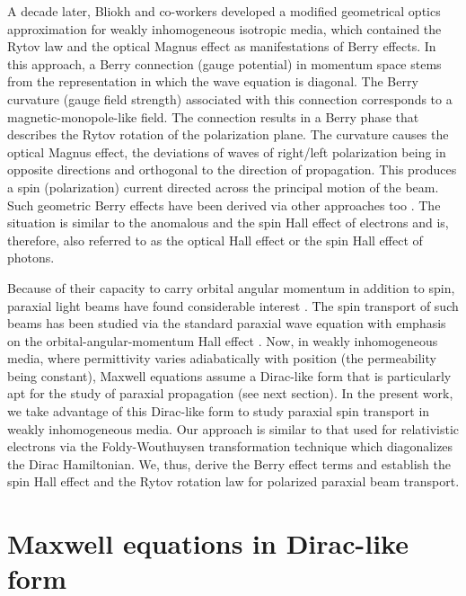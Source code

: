 \documentclass[aps,pra,preprint,superscriptaddress,showpacs,showkeys]{revtex4}
\begin{document}
A decade later, Bliokh and co-workers \cite{Bliokh,Bliokh1,Bliokh2} developed a modified geometrical optics approximation for weakly inhomogeneous isotropic media, which contained the Rytov law and the optical Magnus effect as manifestations of Berry effects. In this approach, a Berry connection (gauge potential) in momentum space stems from the representation in which the wave equation is diagonal. The Berry curvature (gauge field strength) associated with this connection corresponds to a magnetic-monopole-like field. The connection results in a Berry phase that describes the Rytov rotation of the polarization plane. The curvature causes the optical Magnus effect, the deviations of waves of right/left polarization being in opposite directions and orthogonal to the direction of propagation. This produces a spin (polarization) current directed across the principal motion of the beam. Such geometric Berry effects have been derived via other approaches too \cite{Onoda,Duval}. The situation is similar to the anomalous and the spin Hall effect of electrons \cite{Culcer,Murakami,Sinova,Kato,Horvathy} and is, therefore, also referred to as the optical Hall effect or the spin Hall effect of photons.

Because of their capacity to carry orbital angular momentum in addition to spin, paraxial light beams have found considerable interest  \cite{Allen,Beijersbergen,Simpson,Allen2,Maier,Piccirillo}. The spin transport of such beams has been studied via the standard paraxial wave equation with emphasis on the orbital-angular-momentum Hall effect \cite{Bliokh3,Bliokh4}. Now, in weakly inhomogeneous media, where permittivity varies adiabatically with position (the permeability being constant), Maxwell equations assume a Dirac-like form that is particularly apt for the study of paraxial propagation (see next section). In the present work, we take advantage of this Dirac-like form to study paraxial spin transport in weakly inhomogeneous media. Our approach is similar to that used for relativistic electrons \cite{Berard} via the Foldy-Wouthuysen transformation technique which diagonalizes the Dirac Hamiltonian. We, thus, derive the Berry effect terms and establish the spin Hall effect and the Rytov rotation law for polarized paraxial beam transport. 

\section{Maxwell equations in Dirac-like form}
\end{document}
